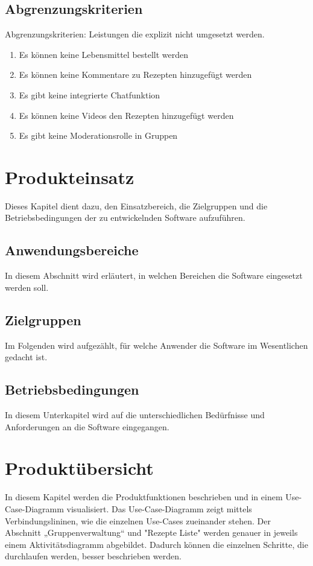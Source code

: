 \documentclass[parskip=full]{scrartcl}
\begin{document}
\subsection{Abgrenzungskriterien}
Abgrenzungskriterien: Leistungen die explizit nicht umgesetzt werden.

\begin{enumerate}[start=1,label={$\langle$\bfseries RW\arabic*$\rangle$}, leftmargin = 5em, itemsep=4pt, parsep=4pt]
    \item Es können keine Lebensmittel bestellt werden
    \item Es können keine Kommentare zu Rezepten hinzugefügt werden
    \item Es gibt keine integrierte Chatfunktion
    \item Es können keine Videos den Rezepten hinzugefügt werden
    \item Es gibt keine Moderationsrolle in Gruppen
\end{enumerate}

\section{Produkteinsatz}
Dieses Kapitel dient dazu, den Einsatzbereich, die Zielgruppen und die Betriebsbedingungen der zu entwickelnden Software aufzuführen.

\subsection{Anwendungsbereiche}
In diesem Abschnitt wird erläutert, in welchen Bereichen die Software eingesetzt werden soll.

\subsection{Zielgruppen}
Im Folgenden wird aufgezählt, für welche Anwender die Software im Wesentlichen gedacht ist.

\subsection{Betriebsbedingungen}
In diesem Unterkapitel wird auf die unterschiedlichen Bedürfnisse und Anforderungen an die Software eingegangen.

\section{Produktübersicht}
In diesem Kapitel werden die Produktfunktionen beschrieben und in einem Use-Case-Diagramm visualisiert.
Das Use-Case-Diagramm zeigt mittels Verbindungslininen, wie die einzelnen Use-Cases zueinander stehen.
Der Abschnitt „Gruppenverwaltung“ und "Rezepte Liste" werden genauer in jeweils einem Aktivitätsdiagramm abgebildet.
Dadurch können die einzelnen Schritte, die durchlaufen werden, besser beschrieben werden.
\end{document}
